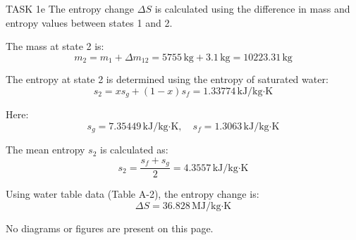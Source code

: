 TASK 1e  
The entropy change \( \Delta S \) is calculated using the difference in mass and entropy values between states 1 and 2.  

The mass at state 2 is:  
\[
m_2 = m_1 + \Delta m_{12} = 5755 \, \text{kg} + 3.1 \, \text{kg} = 10223.31 \, \text{kg}
\]  

The entropy at state 2 is determined using the entropy of saturated water:  
\[
s_2 = x s_g + (1 - x) s_f = 1.33774 \, \text{kJ/kg·K}
\]  

Here:  
\[
s_g = 7.35449 \, \text{kJ/kg·K}, \quad s_f = 1.3063 \, \text{kJ/kg·K}
\]  

The mean entropy \( s_2 \) is calculated as:  
\[
s_2 = \frac{s_f + s_g}{2} = 4.3557 \, \text{kJ/kg·K}
\]  

Using water table data (Table A-2), the entropy change is:  
\[
\Delta S = 36.828 \, \text{MJ/kg·K}
\]  

No diagrams or figures are present on this page.